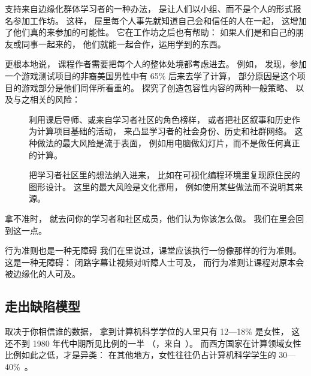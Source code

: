 支持来自边缘化群体学习者的一种办法，
是让人们以小组、而不是个人的形式报名参加工作坊。
这样，
屋里每个人事先就知道自己会和信任的人在一起，
这增加了他们真的来参加的可能性。
它在工作坊之后也有帮助：
如果人们是和自己的朋友或同事一起来的，
他们就能一起合作，运用学到的东西。

更根本地说，
课程作者需要把每个人的整体处境都考虑进去。
例如，
\cite{DiSa2014a}发现，参加一个游戏测试项目的非裔美国男性中有 65\% 后来去学了计算，
部分原因是这个项目的游戏部分是他们同伴所看重的。
\cite{Lach2018}探究了创造包容性内容的两种一般策略、
以及与之相关的风险：

\begin{description}

\item[{}]
  利用课后导师、或来自学习者社区的角色榜样，
  或者把社区叙事和历史作为计算项目基础的活动，
  来凸显学习者的社会身份、历史和社群网络。
  这种做法的最大风险是流于表面，
  例如用电脑做幻灯片，而不是做任何真正的计算。

\item[{}]
  把学习者社区里的想法纳入进来，
  比如在可视化编程环境里复现原住民的图形设计。
  这里的最大风险是文化挪用，
  例如使用某些做法而不说明其来源。

\end{description}

拿不准时，
就去问你的学习者和社区成员，他们认为你该怎么做。
我们在里会回到这一点。

\begin{aside}{行为准则也是一种无障碍}
  我们在里说过，课堂应该执行一份像那样的行为准则。
  这是一种无障碍：
  闭路字幕让视频对听障人士可及，
  而行为准则让课程对原本会被边缘化的人可及。
\end{aside}

\subsection*{走出缺陷模型}

取决于你相信谁的数据，
拿到计算机科学学位的人里只有 12—18\% 是女性，
这还不到 1980 年代中期所见比例的一半
（，来自~\cite{Robe2017}）。
而西方国家在计算领域女性比例如此之低，才是异类：
在其他地方，女性往往仍占计算机科学学生的 30—40\%~\cite{Galp2002,Varm2015}。


